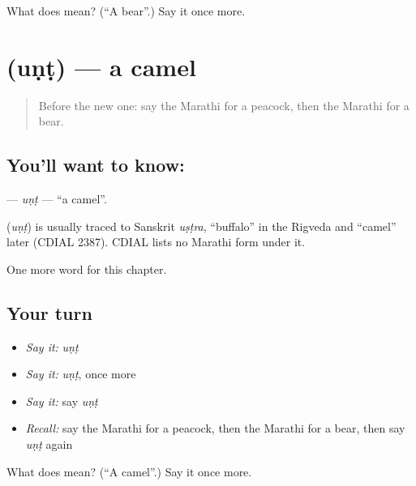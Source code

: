 \begin{tcolorbox}[breakable,colback=teal!4,colframe=teal!35!black,title={Before you move on}]
What does  mean? (\textquotedblleft{}A bear\textquotedblright{}.) Say it once more.
\end{tcolorbox}
\section[\texorpdfstring{\mr{उंट} (uṇṭ)}{उंट (uṇṭ)}]{ (uṇṭ) — a camel}

\label{lesson:MR-C102-unt}



\begin{quote}
Before the new one: say the Marathi for a peacock, then the Marathi for a bear.
\end{quote}

\subsection*{You'll want to know: }
\textbf{} — \emph{uṇṭ} — \textquotedblleft{}a camel\textquotedblright{}.

\begin{cousinweb}
\textbf{} (\emph{uṇṭ}) is usually traced to Sanskrit \emph{uṣṭra}, \textquotedblleft{}buffalo\textquotedblright{} in the Rigveda and \textquotedblleft{}camel\textquotedblright{} later (CDIAL 2387). CDIAL lists no Marathi form under it.
\end{cousinweb}

\begin{grammarlens}[title={What you've built}]
One more word for this chapter.
\end{grammarlens}

\subsection*{Your turn}
\begin{itemize}
\raggedright
  \item \emph{Say it:} \emph{uṇṭ}
  \item \emph{Say it:} \emph{uṇṭ}, once more
  \item \emph{Say it:} say \emph{uṇṭ}
  \item \emph{Recall:} say the Marathi for a peacock, then the Marathi for a bear, then say \emph{uṇṭ} again
\end{itemize}

\begin{tcolorbox}[breakable,colback=teal!4,colframe=teal!35!black,title={Before you move on}]
What does  mean? (\textquotedblleft{}A camel\textquotedblright{}.) Say it once more.
\end{tcolorbox}
